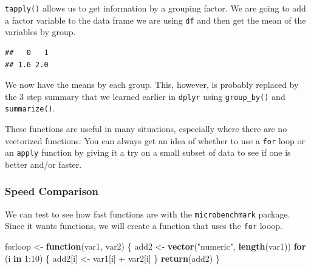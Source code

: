 \documentclass[]{tufte-book}
\newenvironment{Shaded}{}{}
\newcommand{\KeywordTok}[1]{\textcolor[rgb]{0.00,0.44,0.13}{\textbf{#1}}}
\newcommand{\DataTypeTok}[1]{\textcolor[rgb]{0.56,0.13,0.00}{#1}}
\newcommand{\DecValTok}[1]{\textcolor[rgb]{0.25,0.63,0.44}{#1}}
\newcommand{\StringTok}[1]{\textcolor[rgb]{0.25,0.44,0.63}{#1}}
\newcommand{\OtherTok}[1]{\textcolor[rgb]{0.00,0.44,0.13}{#1}}
\newcommand{\ControlFlowTok}[1]{\textcolor[rgb]{0.00,0.44,0.13}{\textbf{#1}}}
\newcommand{\OperatorTok}[1]{\textcolor[rgb]{0.40,0.40,0.40}{#1}}
\newcommand{\NormalTok}[1]{#1}
\theoremstyle{definition}
\theoremstyle{definition}
\theoremstyle{remark}
\begin{document}
\texttt{tapply()} allows us to get information by a grouping factor. We
are going to add a factor variable to the data frame we are using
\texttt{df} and then get the mean of the variables by group.

\begin{Shaded}
\end{Shaded}

\begin{verbatim}
##   0   1 
## 1.6 2.0
\end{verbatim}

We now have the means by each group. This, however, is probably replaced
by the 3 step summary that we learned earlier in \texttt{dplyr} using
\texttt{group\_by()} and \texttt{summarize()}.

These functions are useful in many situations, especially where there
are no vectorized functions. You can always get an idea of whether to
use a \texttt{for} loop or an \texttt{apply} function by giving it a try
on a small subset of data to see if one is better and/or faster.

\subsubsection*{Speed Comparison}\label{speed-comparison}

We can test to see how fast functions are with the
\texttt{microbenchmark} package. Since it wants functions, we will
create a function that uses the \texttt{for} looop.

\begin{Shaded}
\begin{Highlighting}[]
\NormalTok{forloop <-}\StringTok{ }\ControlFlowTok{function}\NormalTok{(var1, var2) \{}
\NormalTok{    add2 <-}\StringTok{ }\KeywordTok{vector}\NormalTok{(}\StringTok{"numeric"}\NormalTok{, }\KeywordTok{length}\NormalTok{(var1))}
    \ControlFlowTok{for}\NormalTok{ (i }\ControlFlowTok{in} \DecValTok{1}\OperatorTok{:}\DecValTok{10}\NormalTok{) \{}
\NormalTok{        add2[i] <-}\StringTok{ }\NormalTok{var1[i] }\OperatorTok{+}\StringTok{ }\NormalTok{var2[i]}
\NormalTok{    \}}
    \KeywordTok{return}\NormalTok{(add2)}
\NormalTok{\}}
\end{Highlighting}
\end{Shaded}
\end{document}
